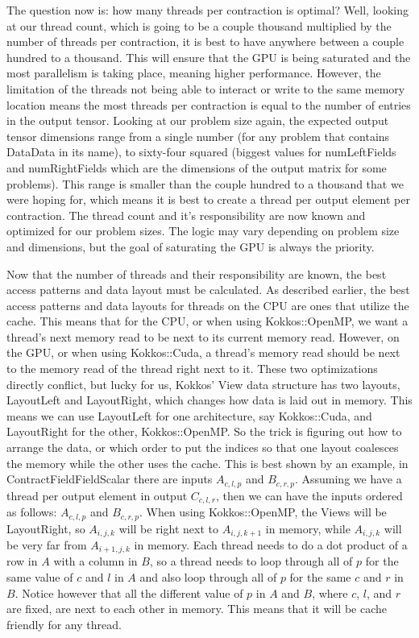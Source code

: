 The question now is: how many threads per contraction is optimal? Well, looking
at our thread count, which is going to be a couple thousand multiplied by the
number of threads per contraction, it is best to have anywhere between a couple
hundred to a thousand. This will ensure that the GPU is being saturated and the
most parallelism is taking place, meaning higher performance. However, the
limitation of the threads not being able to interact or write to the same
memory location means the most threads per contraction is equal to the number
of entries in the output tensor. Looking at our problem size again, the
expected output tensor dimensions range from a single number (for any problem
that contains DataData in its name), to sixty-four squared (biggest values for
numLeftFields and numRightFields which are the dimensions of the output matrix
for some problems). This range is smaller than the couple hundred to a thousand
that we were hoping for, which means it is best to create a thread per output
element per contraction. The thread count and it's responsibility are now known
and optimized for our problem sizes. The logic may vary depending on problem
size and dimensions, but the goal of saturating the GPU is always the priority.

Now that the number of threads and their responsibility are known, the best
access patterns and data layout must be calculated. As described earlier, the
best access patterns and data layouts for threads on the CPU are ones that
utilize the cache. This means that for the CPU, or when using Kokkos::OpenMP,
we want a thread's next memory read to be next to its current memory read.
However, on the GPU, or when using Kokkos::Cuda, a thread's memory read should
be next to the memory read of the thread right next to it. These two
optimizations directly conflict, but lucky for us, Kokkos' View data structure
has two layouts, LayoutLeft and LayoutRight, which changes how data is laid out
in memory. This means we can use LayoutLeft for one architecture, say
Kokkos::Cuda, and LayoutRight for the other, Kokkos::OpenMP. So the trick is
figuring out how to arrange the data, or which order to put the indices so that
one layout coalesces the memory while the other uses the cache. This is best
shown by an example, in ContractFieldFieldScalar there are inputs $A_{c, l, p}$
and $B_{c, r, p}$. Assuming we have a thread per output element in output
$C_{c, l, r}$, then we can have the inputs ordered as follows: $A_{c, l, p}$
and $B_{c, r, p}$. When using Kokkos::OpenMP, the Views will be LayoutRight, so
$A_{i, j, k}$ will be right next to $A_{i, j, k+1}$ in memory, while $A_{i, j,
k}$ will be very far from $A_{i+1, j, k}$ in memory. Each thread needs to do a
dot product of a row in $A$ with a column in $B$, so a thread needs to loop
through all of $p$ for the same value of $c$ and $l$ in $A$ and also loop
through all of $p$ for the same $c$ and $r$ in $B$. Notice however that all the
different value of $p$ in $A$ and $B$, where $c$, $l$, and $r$ are fixed, are
next to each other in memory. This means that it will be cache friendly for any
thread. 

